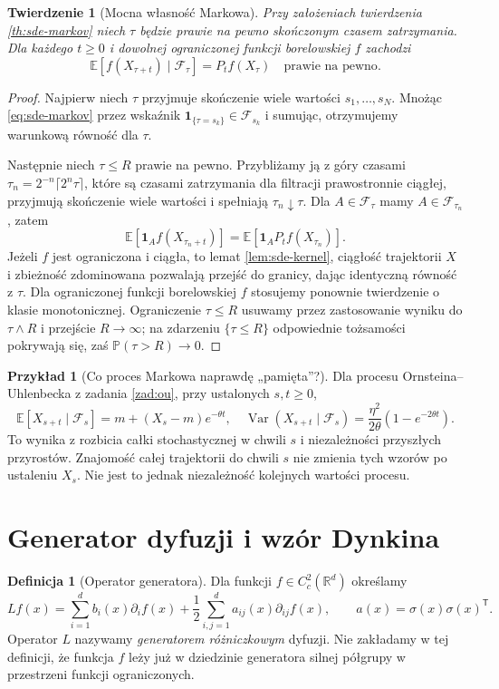 \documentclass[11pt,a4paper,oneside]{report}
\numberwithin{equation}{chapter}
\theoremstyle{plain}
\newtheorem{twierdzenie}{Twierdzenie}[chapter]
\theoremstyle{definition}
\newtheorem{definicja}{Definicja}[chapter]
\newtheorem{przyklad}{Przykład}[chapter]
\theoremstyle{remark}
\newcommand{\R}{\mathbb{R}}
\newcommand{\Prob}{\mathbb{P}}
\newcommand{\E}{\mathbb{E}}
\newcommand{\Var}{\operatorname{Var}}
\newcommand{\calF}{\mathcal{F}}
\newcommand{\ind}[1]{\mathbf{1}_{#1}}
\begin{document}
\begin{twierdzenie}[Mocna własność Markowa]\label{thm:volIII:06:02}
\label{th:sde-strongmarkov}
Przy założeniach twierdzenia \ref{th:sde-markov}
niech $\tau$ będzie prawie na pewno skończonym
czasem zatrzymania. Dla każdego $t\ge0$ i dowolnej
ograniczonej funkcji borelowskiej $f$ zachodzi
\[
\E[f(X_{\tau+t})\mid\calF_\tau]=P_tf(X_\tau)
\quad\text{prawie na pewno}.
\tag{6.4}\label{eq:sde-strongmarkov}
\]
\end{twierdzenie}
\begin{proof}
Najpierw niech $\tau$ przyjmuje skończenie wiele
wartości $s_1,\ldots,s_N$. Mnożąc
\eqref{eq:sde-markov} przez wskaźnik
$\ind{\{\tau=s_k\}}\in\calF_{s_k}$ i sumując,
otrzymujemy warunkową równość dla $\tau$.

Następnie niech $\tau\le R$ prawie na pewno.
Przybliżamy ją z góry czasami
$\tau_n=2^{-n}\lceil2^n\tau\rceil$,
które są czasami zatrzymania dla filtracji
prawostronnie ciągłej, przyjmują skończenie wiele
wartości i spełniają $\tau_n\downarrow\tau$.
Dla $A\in\calF_\tau$ mamy $A\in\calF_{\tau_n}$,
zatem
\[
\E[\ind A f(X_{\tau_n+t})]
=\E[\ind A P_tf(X_{\tau_n})].
\]
Jeżeli $f$ jest ograniczona i ciągła, to lemat
\ref{lem:sde-kernel}, ciągłość trajektorii $X$
i zbieżność zdominowana pozwalają przejść do granicy,
dając identyczną równość z $\tau$.
Dla ograniczonej funkcji borelowskiej $f$ stosujemy
ponownie twierdzenie o klasie monotonicznej.
Ograniczenie $\tau\le R$ usuwamy przez zastosowanie
wyniku do $\tau\wedge R$ i przejście $R\to\infty$;
na zdarzeniu $\{\tau\le R\}$ odpowiednie tożsamości
pokrywają się, zaś $\Prob(\tau>R)\to0$.
\end{proof}

\begin{przyklad}[Co proces Markowa naprawdę „pamięta”?]
Dla procesu Ornsteina--Uhlenbecka z zadania
\ref{zad:ou}, przy ustalonych $s,t\ge0$,
\[
\E[X_{s+t}\mid\calF_s]
=m+(X_s-m)e^{-\theta t},
\quad
\Var(X_{s+t}\mid\calF_s)
=\frac{\eta^2}{2\theta}(1-e^{-2\theta t}).
\]
To wynika z rozbicia całki stochastycznej w chwili
$s$ i niezależności przyszłych przyrostów. Znajomość
całej trajektorii do chwili $s$ nie zmienia tych
wzorów po ustaleniu $X_s$. Nie jest to jednak
niezależność kolejnych wartości procesu.
\end{przyklad}

\section{Generator dyfuzji i wzór Dynkina}\label{sec:volIII:06:03}
\begin{definicja}[Operator generatora]\label{def:volIII:06:02}
Dla funkcji $f\in C_c^2(\R^d)$ określamy
\[
Lf(x)=\sum_{i=1}^d b_i(x)\partial_i f(x)
+\frac12\sum_{i,j=1}^d a_{ij}(x)\partial_{ij}f(x),
\qquad a(x)=\sigma(x)\sigma(x)^{\mathsf T}.
\tag{6.5}\label{eq:sde-generator}
\]
Operator $L$ nazywamy \emph{generatorem różniczkowym}
dyfuzji. Nie zakładamy w tej definicji, że funkcja
$f$ leży już w dziedzinie generatora silnej półgrupy
w przestrzeni funkcji ograniczonych.
\end{definicja}
\end{document}

